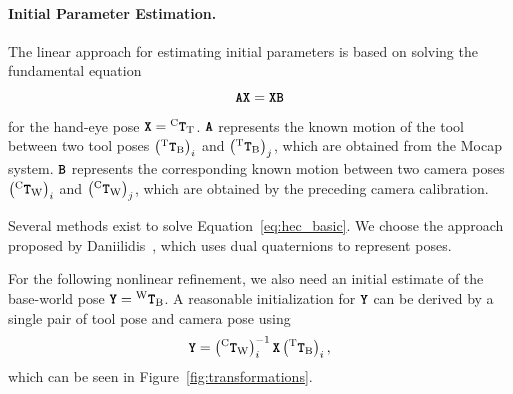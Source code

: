 \documentclass[a4paper,fleqn]{cas-dc}
\newcommand{\Matrix}[1]{{\ensuremath{\textbf{\texttt{#1}}}}}
\newcommand{\TMatrix}[3]{{^{\mathrm{#1}}\Matrix{#2}_{\mathrm{#3}}}}
\begin{document}
\paragraph{Initial Parameter Estimation.}
The linear approach for estimating initial parameters is based on solving the fundamental equation
\begin{equation}
    \label{eq:hec_basic}
    \Matrix{A}\Matrix{X} = \Matrix{X}\Matrix{B}
\end{equation}
for the hand-eye pose $\Matrix{X}=\TMatrix{C}{T}{T}$. \Matrix{A} represents the known motion of the tool between two tool poses $\left(\TMatrix{T}{T}{B}\right)_i$ and $\left(\TMatrix{T}{T}{B}\right)_j$, which are obtained from the Mocap system. \Matrix{B} represents the corresponding known motion between two camera poses $\left(\TMatrix{C}{T}{W}\right)_i$ and $\left(\TMatrix{C}{T}{W}\right)_j$, which are obtained by the preceding camera calibration.

Several methods exist to solve Equation~\ref{eq:hec_basic}. We choose the approach proposed by Daniilidis~\cite{daniilidis_hand-eye_1999}, which uses dual quaternions to represent poses.

For the following nonlinear refinement, we also need an initial estimate of the base-world pose $\Matrix{Y}=\TMatrix{W}{T}{B}$. A reasonable initialization for $\Matrix{Y}$ can be derived by a single pair of tool pose and camera pose using
\begin{equation}
    \Matrix{Y} = \left(\TMatrix{C}{T}{W}\right)_i^{-1}\Matrix{X}\left(\TMatrix{T}{T}{B}\right)_i,
\end{equation}
which can be seen in Figure~\ref{fig:transformations}.
\end{document}
